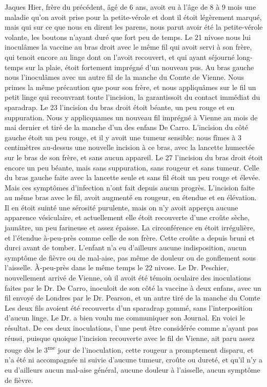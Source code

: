 Jaques Hier, frère du précédent, âgé de 6 ans, avoit eu à l'âge de 8 à 9 mois une maladie qu'on avoit prise pour la petite-vérole et dont il étoit légèrement marqué, mais qui sur ce que nous en dirent les parens, nous parut avoir été la petite-vérole volante, les boutons n'ayant duré que fort peu de temps. Le 21 nivose nous lui inoculâmes la vaccine au bras droit avec le même fil qui avoit servi à son frère, qui tenoit encore au linge dont on l'avoit recouvert, et qui ayant séjourné long-temps sur la plaie, étoit fortement imprégné d'un nouveau pus. Au bras gauche nous l'inoculâmes avec un autre fil de la manche du Comte de Vienne. Nous primes la même précaution que pour son frère, et nous appliquâmes sur le fil un petit linge qui recouvrant toute l'incision, la garantissoit du contact immédiat du\setcounter{page}{114} sparadrap. Le 23 l'incision du bras droit étoit béante, un peu rouge et en suppuration. Nous y applicquames un nouveau fil imprégné à Vienne au mois de mai dernier et tiré de la manche d'un des enfans De Carro. L'incision du côté gauche étoit un peu rouge, et il y avoit une tumeur sensible: nous fîmes à 3 centimètres au-dessus une nouvelle incision à ce bras, avec la lancette humectée sur le bras de son frère, et sans aucun appareil. Le 27 l'incision du bras droit étoit encore un peu béante, mais sans suppuration, sans rougeur et sans tumeur. Celle du bras gauche faite avec la lancette seule et sans fil étoit un peu rouge et élevée. Mais ces symptômes d'infection n'ont fait depuis aucun progrès. L'incision faite au même bras avec le fil, avoit augmenté en rougeur, en étendue et en élévation. Il en étoit suinté une sérosité purulente, mais on n'y avoit apperçu aucune apparence vésiculaire, et actuellement elle étoit recouverte d'une croûte sèche, jaunâtre, un peu farineuse et assez épaisse. La circonférence en étoit irrégulière, et l'étendue à-peu-près comme celle de son frère. Cette croûte a depuis bruni et durci avant de tomber. L'enfant n'a eu d'ailleurs aucune indisposition, aucun symptôme de fièvre ou de mal-aise, pas même de douleur ou de gonflement sous l'aisselle.
À-peu-près dans le même temps le 22 nivose. Le Dr. Peschier, nouvellement arrivé de Vienne, où il avoit été témoin oculaire des inoculations faites par le Dr. De Carro, inoculoit de son côté la vaccine à deux enfans, avec un fil envoyé de Londres par le Dr. Pearson,\setcounter{page}{115} et un autre tiré de la manche du Comte Les deux fils avoient été recouverts d'un sparadrap gommé, sans l'interposition d'aucun linge. Le Dr. a bien voulu me communiquer son Journal. En voici le résultat. De ces deux inoculations, l'une peut être considérée comme n'ayant pas réussi, puisque quoique l'incision recouverte avec le fil de Vienne, ait paru assez rouge dès le 3\textsuperscript{me} jour de l'inoculation, cette rougeur a promptement disparu, et n'a été ni accompagnée ni suivie d'aucune tumeur, croûte ou dureté, et qu'il n'y a eu d'ailleurs aucun mal-aise général, aucune douleur à l'aisselle, aucun symptôme de fièvre.
